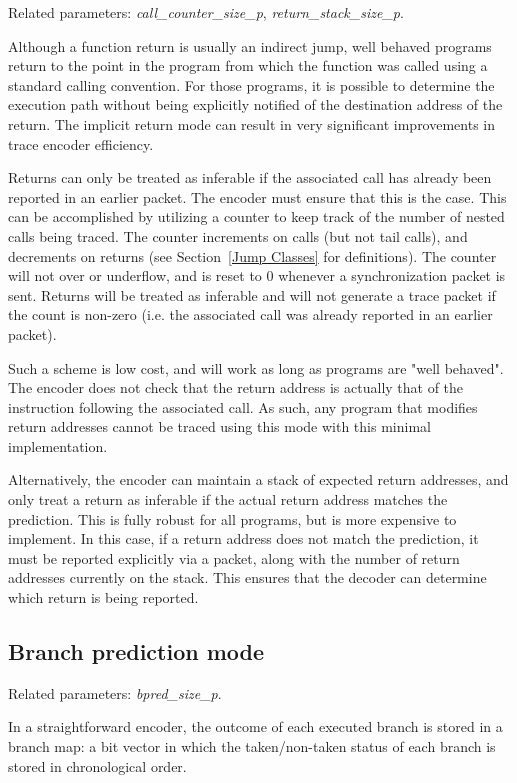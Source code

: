 Related parameters: \textit{call\_counter\_size\_p}, \textit{return\_stack\_size\_p}.

Although a function return is usually an indirect jump, well behaved programs return to the
point in the program from which the function was called using a standard calling convention.
For those programs, it is possible to determine the execution path without being explicitly notified
of the destination address of the return.  The implicit return mode can result in very
significant improvements in trace encoder efficiency.

Returns can only be treated as inferable if the associated call has already been reported in
an earlier packet.  The encoder must ensure that this is the case.  This can be accomplished
by utilizing a counter to keep track of the number of nested calls being traced.  The counter
increments on calls (but not tail calls), and decrements on returns (see Section~\ref{Jump Classes}
for definitions).  The counter will not over or underflow, and is reset to 0 whenever a
synchronization packet is sent.  Returns will be treated as inferable and will not generate a trace
packet if the count is non-zero (i.e. the associated call was already reported in an earlier packet).

Such a scheme is low cost, and will work as long as programs are "well behaved".  The encoder does not check that the
return address is actually that of the instruction following the associated call.  As such, any program that
modifies return addresses cannot be traced using this mode with this minimal implementation.

Alternatively, the encoder can maintain a stack of expected return addresses, and only treat a
return as inferable if the actual return address matches the prediction.  This is fully robust for all
programs, but is more expensive to implement.  In this case, if a return address does not match the prediction, 
it must be reported explicitly via a packet, along with the number of return addresses
currently on the stack.  This ensures that the decoder can determine which return is being reported. 

\subsection{Branch prediction mode} \label{sec:branch-prediction}

Related parameters: \textit{bpred\_size\_p}.

In a straightforward encoder, the outcome of each executed branch is stored in
a branch map: a bit vector in which the taken/non-taken status of each branch is stored in
chronological order.

